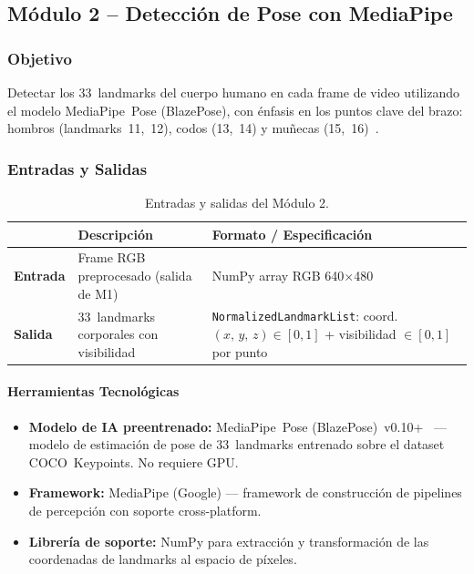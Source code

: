 \subsection{Módulo 2 -- Detección de Pose con MediaPipe}
\subsubsection*{Objetivo}

Detectar los 33~landmarks del cuerpo humano en cada frame de video
utilizando el modelo MediaPipe~Pose (BlazePose), con énfasis en los
puntos clave del brazo: hombros (landmarks~11,~12), codos
(13,~14) y muñecas (15,~16)~\cite{Bazarevskyetal2020}.

\subsubsection*{Entradas y Salidas}

\begin{table}[h!]
\centering
\renewcommand{\arraystretch}{1.3}
\begin{tabularx}{\textwidth}{
    >{\bfseries}p{3cm}
    X
    X
}    
\toprule
&
\textbf{Descripción} &
\textbf{Formato / Especificación} \\
\midrule
Entrada &
  Frame RGB preprocesado (salida de M1) &
  NumPy array RGB 640$\times$480 \\
\midrule
Salida &
  33~landmarks corporales con visibilidad &
  \texttt{NormalizedLandmarkList}: coord.\
  $(x,\,y,\,z) \in [0,1]$ + visibilidad $\in [0,1]$
  por punto \\
\bottomrule
\end{tabularx}
\caption{Entradas y salidas del Módulo 2.}
\label{tab:m2_io}
\end{table}
 
\paragraph{Herramientas Tecnológicas}
\begin{itemize}[leftmargin=1.5em]
  \item \textbf{Modelo de IA preentrenado:}
        MediaPipe~Pose (BlazePose)~v0.10+~\cite{Bazarevskyetal2020,Lugaresietal2019}
        — modelo de estimación de pose de 33~landmarks entrenado sobre
        el dataset COCO~Keypoints. No requiere GPU.
  \item \textbf{Framework:} MediaPipe (Google) \cite{Lugaresietal2019}
        — framework de construcción de pipelines de percepción con
        soporte cross-platform.
  \item \textbf{Librería de soporte:} NumPy para extracción y
        transformación de las coordenadas de landmarks al espacio de
        píxeles.
\end{itemize}
 
